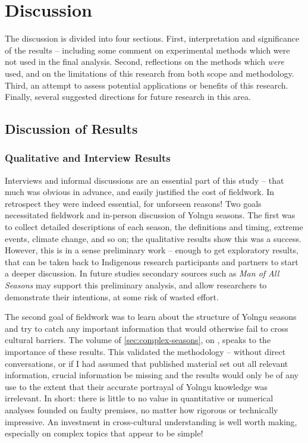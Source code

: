 \chapter{Discussion}
\label{ch:discussion}

The discussion is divided into four sections.  First, interpretation and
significance of the results -- including some comment on experimental methods
which were not used in the final analysis.  Second, reflections on the methods
which \emph{were} used, and on the limitations of this research from both
scope and methodology.  Third, an attempt to assess potential applications or
benefits of this research.  Finally, several suggested directions for future
research in this area.



\section{Discussion of Results}
\label{sec:disc-results}

\subsection{Qualitative and Interview Results}

Interviews and informal discussions are an essential part of this study --
that much was obvious in advance, and easily justified the cost of fieldwork.
In retrospect they were indeed essential, for unforseen reasons!
%
Two goals necessitated fieldwork and in-person discussion of Yolngu seasons.
The first was to collect detailed descriptions of each season, the definitions
and timing, extreme events, climate change, and so on; the qualitative results
show this was a success.  However, this is in a sense preliminary work --
enough to get exploratory results, that can be taken back to Indigenous
research participants and partners to start a deeper discussion.  In future
studies secondary sources such as \textit{Man of All Seasons} \citep{davis1989}
may support this preliminary analysis, and allow researchers to demonstrate
their intentions, at some risk of wasted effort.

The second goal of fieldwork  was to learn about the structure of Yolngu
seasons and try to catch any important information that would otherwise
fail to cross cultural barriers.  The volume of \cref{sec:complex-seasons},
on \textit{}, speaks to the importance of these
results.
%
This validated the methodology -- without direct conversations, or if I had
assumed that published material set out all relevant information, crucial
information be missing and the results would only be of any use to the extent
that their accurate portrayal of Yolngu knowledge was irrelevant.
%
In short: there is little to no value in quantitative or numerical analyses
founded on faulty premises, no matter how rigorous or technically impressive.
An investment in cross-cultural understanding is well worth making, especially
on complex topics that appear to be simple!



